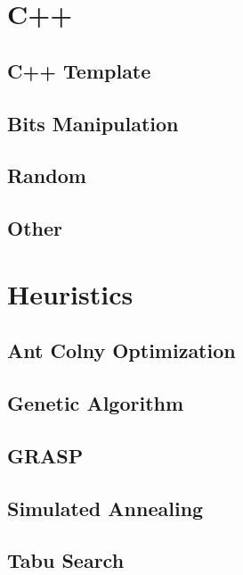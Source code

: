 \section{C++}
\subsection{C++ Template}
\raggedbottom
\hrulefill
\subsection{Bits Manipulation}
\raggedbottom
\hrulefill
\subsection{Random}
\raggedbottom
\hrulefill
\subsection{Other}
\raggedbottom
\hrulefill

\section{Heuristics}
\subsection{Ant Colny Optimization}
\raggedbottom
\hrulefill
\subsection{Genetic Algorithm}
\raggedbottom
\hrulefill
\subsection{GRASP}
\raggedbottom
\hrulefill
\subsection{Simulated Annealing}
\raggedbottom
\hrulefill
\subsection{Tabu Search}
\raggedbottom
\hrulefill

